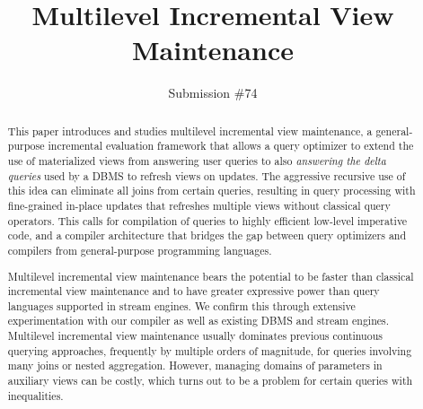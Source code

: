 \documentclass{sig-alternate}
\title{Multilevel Incremental View Maintenance}
\author{
Submission \#74
}
\newcommand{\comment}[1]{}
\begin{document}
\maketitle


\begin{abstract}
This paper introduces and studies multilevel incremental view maintenance,
a general-purpose incremental
evaluation framework that allows a query optimizer to extend the use of
materialized views from answering user queries to also \textit{answering the delta
queries} used by a DBMS to refresh views on updates.
The aggressive recursive use of this idea can eliminate all joins from certain
queries, resulting in query processing with fine-grained in-place updates that
refreshes multiple views without classical query operators. This calls for
compilation of queries to highly efficient low-level imperative code, and a
compiler architecture that bridges the gap between query optimizers and
compilers from general-purpose programming languages.


\comment{
Multilevel incremental view maintenance generalizes the idea of using
materialized views for query answering by allowing a query optimizer to use
materialized views for also answering delta queries, which are the auxiliary
queries that are used in incremental view maintenance to refresh materialized
views when updates happen. Aggressive recursive use of this idea allows to
eliminate all joins from certain queries and to generate highly efficient
low-level code without classical query operators that performs all query
evaluation and view refreshment work. This calls for the compilation of queries.

In this paper, we present a general compiler architecture for languages such as
SQL. To realize such a compiler, we overcome the challenges of materializing
views with binding patterns (parameters) to support arbitrarily nested queries
with aggregates, complex patterns of side effects that may arise, and the need
to perform sophisticated forms of deforestation and fusion frequently employed
in compilers but almost unknown in the database literature.
}

Multilevel incremental view maintenance bears the potential to be
faster than classical incremental view
maintenance and to have greater expressive power than query
languages supported in stream engines.
%
We confirm this through extensive experimentation with
our compiler as well as existing DBMS and stream engines.
%
%
Multilevel incremental view maintenance usually dominates
previous continuous querying approaches, frequently by multiple orders of
magnitude, for queries involving many joins or nested aggregation. However,
managing domains of parameters in auxiliary views can be costly, which turns out
to be a problem for certain queries with inequalities.
\end{abstract}
\end{document}
